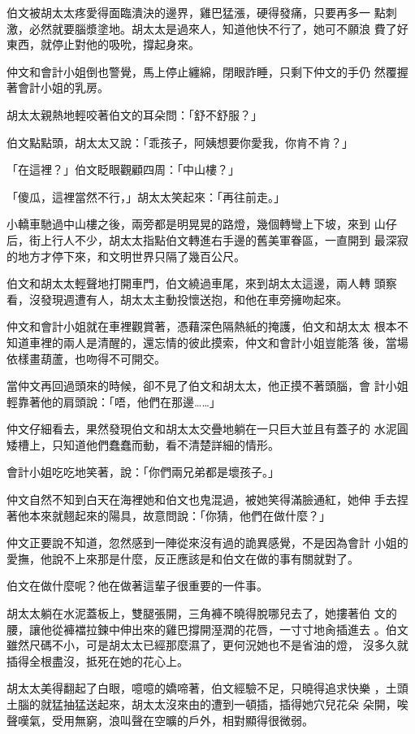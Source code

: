 伯文被胡太太疼愛得面臨潰決的邊界，雞巴猛漲，硬得發痛，只要再多一
點刺激，必然就要腦漿塗地。胡太太是過來人，知道他快不行了，她可不願浪
費了好東西，就停止對他的吸吮，撐起身來。

仲文和會計小姐倒也警覺，馬上停止纏綿，閉眼詐睡，只剩下仲文的手仍
然覆握著會計小姐的乳房。

胡太太親熱地輕咬著伯文的耳朵問：「舒不舒服？」

伯文點點頭，胡太太又說：「乖孩子，阿姨想要你愛我，你肯不肯？」

「在這裡？」伯文眨眼觀顧四周：「中山樓？」

「傻瓜，這裡當然不行，」胡太太笑起來：「再往前走。」

小轎車馳過中山樓之後，兩旁都是明晃晃的路燈，幾個轉彎上下坡，來到
山仔后，街上行人不少，胡太太指點伯文轉進右手邊的舊美軍眷區，一直開到
最深寂的地方才停下來，和文明世界只隔了幾百公尺。

伯文和胡太太輕聲地打開車門，伯文繞過車尾，來到胡太太這邊，兩人轉
頭察看，沒發現週遭有人，胡太太主動投懷送抱，和他在車旁擁吻起來。

仲文和會計小姐就在車裡觀賞著，憑藉深色隔熱紙的掩護，伯文和胡太太
根本不知道車裡的兩人是清醒的，還忘情的彼此摸索，仲文和會計小姐豈能落
後，當場依樣畫葫蘆，也吻得不可開交。

當仲文再回過頭來的時候，卻不見了伯文和胡太太，他正摸不著頭腦，會
計小姐輕靠著他的肩頭說：「唔，他們在那邊……」

仲文仔細看去，果然發現伯文和胡太太交疊地躺在一只巨大並且有蓋子的
水泥圓矮槽上，只知道他們蠢蠢而動，看不清楚詳細的情形。

會計小姐吃吃地笑著，說：「你們兩兄弟都是壞孩子。」

仲文自然不知到白天在海裡她和伯文也鬼混過，被她笑得滿臉通紅，她伸
手去捏著他本來就翹起來的陽具，故意問說：「你猜，他們在做什麼？」

仲文正要說不知道，忽然感到一陣從來沒有過的詭異感覺，不是因為會計
小姐的愛撫，他說不上來那是什麼，反正應該是和伯文在做的事有關就對了。

伯文在做什麼呢？他在做著這輩子很重要的一件事。

胡太太躺在水泥蓋板上，雙腿張開，三角褲不曉得脫哪兒去了，她摟著伯
文的腰，讓他從褲襠拉鍊中伸出來的雞巴撐開溼潤的花唇，一寸寸地肏插進去
。伯文雖然尺碼不小，可是胡太太已經那麼濕了，更何況她也不是省油的燈，
沒多久就插得全根盡沒，抵死在她的花心上。

胡太太美得翻起了白眼，噫噫的嬌啼著，伯文經驗不足，只曉得追求快樂
，土頭土腦的就猛抽猛送起來，胡太太沒來由的遭到一頓插，插得她穴兒花朵
朵開，唉聲嘆氣，受用無窮，浪叫聲在空曠的戶外，相對顯得很微弱。


